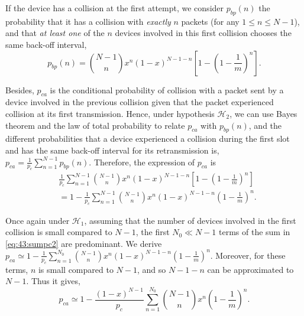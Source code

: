 If the device has a collision at the first attempt, we consider $p_{bp}(n)$ the probability that it has a collision with \emph{exactly} $n$ packets (for any $1\leq n \leq N-1$), and that \emph{at least one} of the $n$ devices involved in this first collision chooses the same back-off interval,
%
\begin{equation}
    p_{bp}(n) = {N-1 \choose n} x^n \left(1-x\right)^{N-1-n}\left[1-\left( 1-\frac{1}{m}\right)^n \right].
\end{equation}


Besides, $p_{ca}$ is the conditional probability of collision with a packet sent by a device involved in the previous collision given that the packet experienced collision at its first transmission.
Hence, under hypothesis $\mathcal{H}_{2}$, we can use Bayes theorem and the law of total probability to relate $p_{ca}$ with $p_{bp}(n)$, and the different probabilities that a device experienced a collision during the first slot and has the same back-off interval for its retransmission is,
%
	$p_{ca} = \frac{1}{p_c}\sum_{n=1}^{N-1} p_{bp}(n)$.
%
%
Therefore, the expression of $p_{ca}$ is
%
\begin{align}\label{eq:43:sumpc2}
	& \frac{1}{p_c} \sum_{n=1}^{N-1}{N-1 \choose n} x^n \left(1-x\right)^{N-1-n}\left[1-\left( 1-\frac{1}{m}\right)^n \right]\nonumber \\
	& = 1- \frac{1}{p_c}\sum_{n=1}^{N-1}{N-1 \choose n} x^n \left(1-x\right)^{N-1-n}\left( 1-\frac{1}{m}\right)^n.
\end{align}

Once again under $\mathcal{H}_{1}$, assuming that the number of devices involved in the first collision is small compared to $N-1$, the first $N_0 \ll N-1$ terms of the sum in \eqref{eq:43:sumpc2} are predominant. We derive $p_{ca} \simeq  1- \frac{1}{p_c}\sum_{n=1}^{N_0}{N-1 \choose n} x^n\left(1-x\right)^{N-1-n} \left( 1-\frac{1}{m}\right)^n$.
%
Moreover, for these terms, $n$ is small compared to $N-1$, and so $N-1-n$ can be approximated to $N-1$. Thus it gives,
%
\begin{equation}\label{eq:43:sumpca3}
	p_{ca} \simeq  1- \frac{\left(1-x\right)^{N-1}}{p_c}\sum_{n=1}^{N_0}{N-1 \choose n} x^n \left( 1-\frac{1}{m}\right)^n.
\end{equation}


